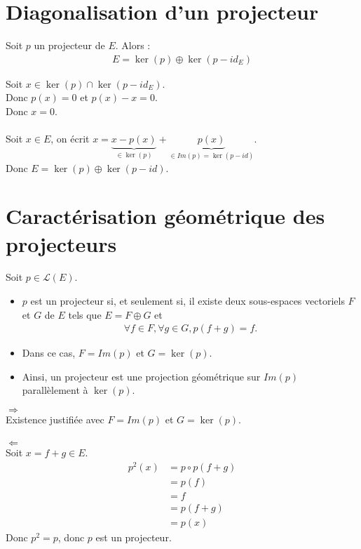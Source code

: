 \documentclass[../main.tex]{subfiles}
\begin{document}
\section{Diagonalisation d'un projecteur}
\begin{tcolorbox}[title=Théorème 21.53, title filled=false, colframe=orange, colback=orange!10!white]
    Soit $p$ un projecteur de $E$. Alors : 
    \begin{align*}
        E = \ker(p) \oplus \ker(p - id_E)
    \end{align*}
\end{tcolorbox}

\noindent Soit $x\in \ker(p) \cap \ker(p - id_E)$. \\
Donc $p(x) = 0$ et $p(x) - x = 0$. \\
Donc $x = 0$. \\ \\
Soit $x\in E$, on écrit $x = \underbrace{x - p(x)}_{\in \ker(p)} + \underbrace{p(x)}_{\in Im(p) = \ker(p - id)}$. \\
Donc $E = \ker(p) \oplus \ker(p - id)$. \\

\section{Caractérisation géométrique des projecteurs}
\begin{tcolorbox}[title=Théorème 21.57, title filled=false, colframe=orange, colback=orange!10!white]
    Soit $p\in \mathcal{L}(E)$. 
    \begin{itemize}
        \item $p$ est un projecteur si, et seulement si, il existe deux sous-espaces vectoriels $F$ et $G$ de $E$ tels que $E = F \oplus G$ et 
        \begin{align*}
            \forall f \in F, \forall g \in G, p(f + g) = f. 
        \end{align*}
        \item Dans ce cas, $F = Im(p)$ et $G = \ker(p)$.
        \item Ainsi, un projecteur est une projection géométrique sur $Im(p)$ parallèlement à $\ker(p)$. 
    \end{itemize}
\end{tcolorbox}

$\boxed{\Rightarrow}$ \\
Existence justifiée avec $F = Im(p)$ et $G = \ker(p)$. \\ \\

$\boxed{\Leftarrow}$ \\
Soit $x = f + g \in E$. 
\begin{align*}
    p^2(x) &= p \circ p(f + g) \\
    &= p(f) \\
    &= f \\
    &= p(f + g) \\
    &= p(x)
\end{align*}
Donc $p^2 = p$, donc $p$ est un projecteur.
\end{document}
